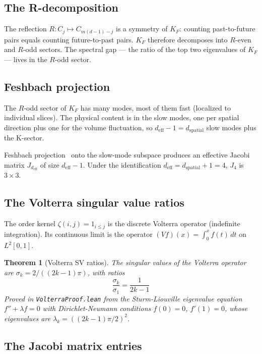 \documentclass[11pt,letterpaper]{article}
\newtheorem{theorem}{Theorem}
\theoremstyle{remark}
\newcommand{\lean}[1]{\texttt{\small #1}}
\begin{document}
\subsection{The R-decomposition}

The reflection $R: C_j \mapsto C_{m(d-1)-j}$ is a symmetry of $K_F$:
counting past-to-future pairs equals counting future-to-past pairs.
$K_F$ therefore decomposes into $R$-even and $R$-odd sectors. The
spectral gap — the ratio of the top two eigenvalues of $K_F$ —
lives in the $R$-odd sector.

\subsection{Feshbach projection}

The $R$-odd sector of $K_F$ has many modes, most of them fast
(localized to individual slices). The physical content is in the
slow modes, one per spatial direction plus one for the volume
fluctuation, so $d_{\mathrm{eff}} - 1 = d_{\mathrm{spatial}}$ slow
modes plus the K-sector.

Feshbach projection~\cite{Feshbach} onto the slow-mode subspace
produces an effective Jacobi matrix $J_{d_{\mathrm{eff}}}$ of size
$d_{\mathrm{eff}} - 1$. Under the identification
$d_{\mathrm{eff}} = d_{\mathrm{spatial}} + 1 = 4$, $J_4$ is
$3 \times 3$.

\subsection{The Volterra singular value ratios}

The order kernel $\zeta(i,j) = 1_{i \leq j}$ is the discrete Volterra
operator (indefinite integration). Its continuous limit is the
operator $(Vf)(x) = \int_0^x f(t)\,dt$ on $L^2[0, 1]$.

\begin{theorem}[Volterra SV ratios]
\label{thm:volterra}
The singular values of the Volterra operator are
$\sigma_k = 2/((2k-1)\pi)$, with ratios
\[
  \frac{\sigma_k}{\sigma_1} = \frac{1}{2k - 1}
\]
Proved in \lean{VolterraProof.lean} from the Sturm-Liouville
eigenvalue equation $f'' + \lambda f = 0$ with Dirichlet-Neumann
conditions $f(0) = 0$, $f'(1) = 0$, whose eigenvalues are
$\lambda_k = ((2k-1)\pi/2)^2$.
\end{theorem}

\subsection{The Jacobi matrix entries}
\end{document}
